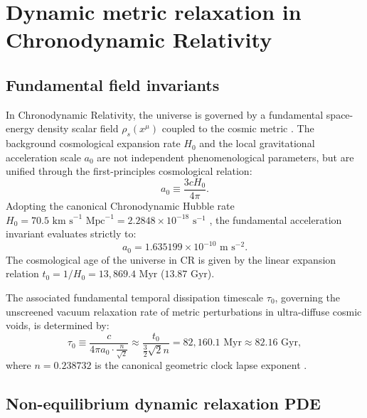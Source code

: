 \documentclass[aps,prd,reprint,superscriptaddress,nofootinbib,floatfix,amsmath,amssymb]{revtex4-2}
\begin{document}
\section{Dynamic metric relaxation in Chronodynamic Relativity}
\label{sec:theory}

\subsection{Fundamental field invariants}

In Chronodynamic Relativity, the universe is governed by a fundamental space-energy density scalar field $\rho_s(x^\mu)$ coupled to the cosmic metric \cite{Shreve2026_Foundations}. The background cosmological expansion rate $H_0$ and the local gravitational acceleration scale $a_0$ are not independent phenomenological parameters, but are unified through the first-principles cosmological relation:
\begin{equation}
a_0 \equiv \frac{3 c H_0}{4\pi}.
\label{eq:a0_def}
\end{equation}
Adopting the canonical Chronodynamic Hubble rate $H_0 = 70.5\text{ km s}^{-1}\text{ Mpc}^{-1} = 2.2848 \times 10^{-18}\text{ s}^{-1}$ \cite{Shreve2026_Expansion}, the fundamental acceleration invariant evaluates strictly to:
\begin{equation}
a_0 = 1.635199 \times 10^{-10}\text{ m s}^{-2}.
\label{eq:a0_value}
\end{equation}
The cosmological age of the universe in CR is given by the linear expansion relation $t_0 = 1/H_0 = 13{,}869.4\text{ Myr}$ ($13.87\text{ Gyr}$).

The associated fundamental temporal dissipation timescale $\tau_0$, governing the unscreened vacuum relaxation rate of metric perturbations in ultra-diffuse cosmic voids, is determined by:
\begin{equation}
\tau_0 \equiv \frac{c}{4\pi a_0 \cdot \frac{n}{\sqrt{2}}} \approx \frac{t_0}{\frac{3}{2}\sqrt{2} n} = 82{,}160.1\text{ Myr} \approx 82.16\text{ Gyr},
\label{eq:tau0_def}
\end{equation}
where $n = 0.238732$ is the canonical geometric clock lapse exponent \cite{Shreve2026_TemporalDissipation,Shreve2026_CMB}.

\subsection{Non-equilibrium dynamic relaxation PDE}
\end{document}
